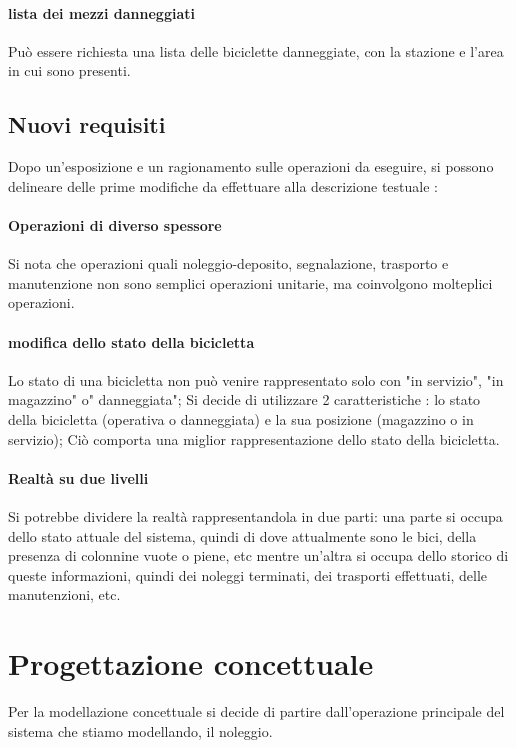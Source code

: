 \documentclass[a4paper,twoside]{article}
\begin{document}
\paragraph{lista dei mezzi danneggiati} Può essere richiesta una lista delle biciclette danneggiate, con la stazione e l'area in cui sono presenti.

\subsection{Nuovi requisiti}
Dopo un'esposizione e un ragionamento sulle operazioni da eseguire, si possono delineare delle prime modifiche da effettuare alla descrizione testuale :
\paragraph{Operazioni di diverso spessore} Si nota che operazioni quali noleggio-deposito, segnalazione, trasporto e manutenzione non sono semplici operazioni unitarie, ma coinvolgono molteplici operazioni.
\paragraph{modifica dello stato della bicicletta} Lo stato di una bicicletta non può venire rappresentato solo con "in servizio", "in magazzino" o" danneggiata"; Si decide di utilizzare 2 caratteristiche : lo stato della bicicletta (operativa o danneggiata) e la sua posizione (magazzino o in servizio); Ciò comporta una miglior rappresentazione dello stato della bicicletta.
\paragraph{Realtà su due livelli} Si potrebbe dividere la realtà rappresentandola in due parti: una parte si occupa dello stato attuale del sistema, quindi di dove attualmente sono le bici, della presenza di colonnine vuote o piene, etc mentre un'altra si occupa dello storico di queste informazioni, quindi dei noleggi terminati, dei trasporti effettuati, delle manutenzioni, etc.

\section{Progettazione concettuale}

Per la modellazione concettuale si decide di partire dall'operazione principale del sistema che stiamo modellando, il noleggio.
\end{document}
